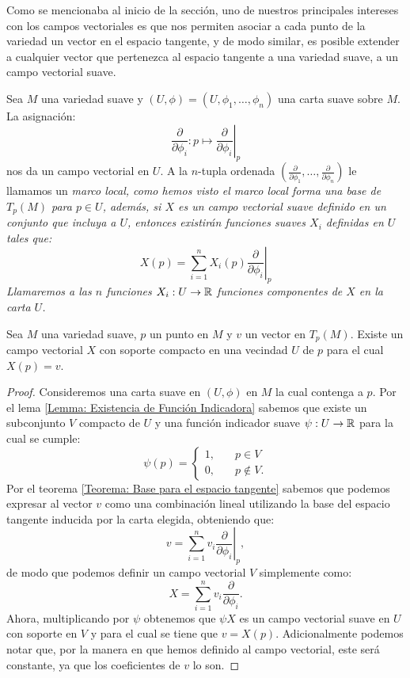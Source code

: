 Como se mencionaba al inicio de la sección, uno de nuestros principales intereses con los campos vectoriales es que nos permiten asociar a cada punto de la variedad un vector en el espacio tangente, y de modo similar, es posible extender a cualquier vector que pertenezca al espacio tangente a una variedad suave, a un campo vectorial suave.

\begin{example}\label{Ejemplo: Campo Vectorial en M}
	Sea $M$ una variedad suave y $(U,\phi)=(U,\phi_1, \dots,\phi_n)$ una carta suave sobre $M$. La asignación:
	\[
		\frac{\partial}{\partial \phi_i}: p \mapsto \left. \frac{\partial}{\partial \phi_i}\right|_{p}
	\]
	nos da un campo vectorial en $U$. A la $n$-tupla ordenada $(\frac{\partial}{\partial \phi_1}, \dots, \frac{\partial}{\partial \phi_n})$ le llamamos un \it{marco local}, como hemos visto el marco local forma una base de $T_p(M)$ para $p \in U$, además, si $X$ es un campo vectorial suave definido en un conjunto que incluya a $U$, entonces existirán funciones suaves $X_i$ definidas en $U$ tales que:
	\[
		X(p) = \sum_{i=1}^{n}X_i(p)\left.\frac{\partial}{\partial\phi_i} \right|_{p}
	\]
	Llamaremos a las $n$ funciones $X_i: U \to \mathbb{R}$ \it{funciones componentes de $X$} en la carta $U$.
\end{example}


\begin{lemma}\label{Lema: Existencia de Campo Vectorial Suave}
	Sea $M$ una variedad suave, $p$ un punto en $M$ y $v$ un vector en $T_p(M)$. Existe un campo vectorial $X$ con soporte compacto en una vecindad $U$ de $p$ para el cual $X(p) = v$.
\end{lemma}

\begin{proof}
	Consideremos una carta suave en $(U,\phi)$ en $M$ la cual contenga a $p$. Por el lema \ref{Lemma: Existencia de Función Indicadora} sabemos que existe un subconjunto $V$ compacto de $U$ y una función indicador suave $\psi: U \to \mathbb{R}$ para la cual se cumple:
	\[
		\psi(p) = \begin{cases}
			1, \quad & p \in V     \\
			0, \quad & p \notin V.
		\end{cases}
	\]
	Por el teorema \ref{Teorema: Base para el espacio tangente} sabemos que podemos expresar al vector $v$ como una combinación lineal utilizando la base del espacio tangente inducida por la carta elegida, obteniendo que:
	\[
		v = \sum_{i=1}^{n} v_i
		\left. \frac{\partial}{\partial \phi_i} \right|_p,
	\]
	de modo que podemos definir un campo vectorial $V$ simplemente como:
	\[
		X = \sum_{i=1}^n v_i \frac{\partial}{\partial \phi_i}.
	\]
	Ahora, multiplicando por $\psi$ obtenemos que $\psi X$ es un campo vectorial suave en $U$ con soporte en $V$ y para el cual se tiene que $v = X(p)$. Adicionalmente podemos notar que, por la manera en que hemos definido al campo vectorial, este será constante, ya que los coeficientes de $v$ lo son.
\end{proof}

